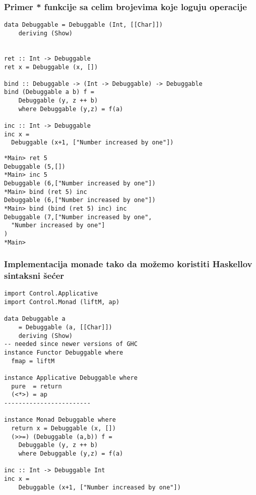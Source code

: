 \documentclass{beamer}
\begin{document}
\begin{frame}[fragile]
\frametitle{Primer * funkcije sa celim brojevima koje loguju operacije}
\begin{lstlisting}
data Debuggable = Debuggable (Int, [[Char]]) 
    deriving (Show)


ret :: Int -> Debuggable 
ret x = Debuggable (x, [])

bind :: Debuggable -> (Int -> Debuggable) -> Debuggable
bind (Debuggable a b) f = 
    Debuggable (y, z ++ b) 
    where Debuggable (y,z) = f(a)

inc :: Int -> Debuggable  
inc x = 
  Debuggable (x+1, ["Number increased by one"])
\end{lstlisting}
\end{frame}

\begin{frame}[fragile]
\begin{lstlisting}
*Main> ret 5 
Debuggable (5,[])
*Main> inc 5 
Debuggable (6,["Number increased by one"])
*Main> bind (ret 5) inc 
Debuggable (6,["Number increased by one"])
*Main> bind (bind (ret 5) inc) inc
Debuggable (7,["Number increased by one",
  "Number increased by one"]
)
*Main> 
\end{lstlisting}
\end{frame}



\begin{frame}[fragile]
\frametitle{Implementacija monade tako da možemo koristiti Haskellov sintaksni šećer}
\begin{lstlisting}
import Control.Applicative 
import Control.Monad (liftM, ap)

data Debuggable a 
    = Debuggable (a, [[Char]]) 
    deriving (Show)
-- needed since newer versions of GHC
instance Functor Debuggable where
  fmap = liftM

instance Applicative Debuggable where
  pure  = return
  (<*>) = ap
------------------------

instance Monad Debuggable where 
  return x = Debuggable (x, [])
  (>>=) (Debuggable (a,b)) f = 
    Debuggable (y, z ++ b) 
    where Debuggable (y,z) = f(a)

inc :: Int -> Debuggable Int
inc x = 
    Debuggable (x+1, ["Number increased by one"])
\end{lstlisting}
\end{frame}
\end{document}
